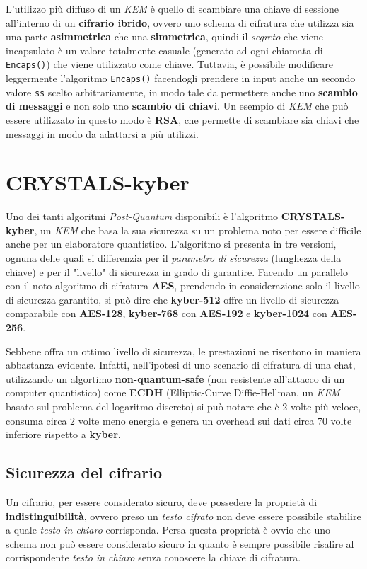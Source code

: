 L'utilizzo più diffuso di un \emph{KEM} è quello di scambiare una chiave di sessione all'interno di un \textbf{cifrario ibrido}, ovvero uno schema di cifratura che utilizza sia una parte \textbf{asimmetrica} che una \textbf{simmetrica}, quindi il \emph{segreto} che viene incapsulato è un valore totalmente casuale (generato ad ogni chiamata di \texttt{Encaps()}) che viene utilizzato come chiave. Tuttavia, è possibile modificare leggermente l'algoritmo \texttt{Encaps()} facendogli prendere in input anche un secondo valore \texttt{ss} scelto arbitrariamente, in modo tale da permettere anche uno \textbf{scambio di messaggi} e non solo uno \textbf{scambio di chiavi}. Un esempio di \emph{KEM} che può essere utilizzato in questo modo è \textbf{RSA}, che permette di scambiare sia chiavi che messaggi in modo da adattarsi a più utilizzi. \cite{wikipedia_kem}

\section{CRYSTALS-kyber}
Uno dei tanti algoritmi \emph{Post-Quantum} disponibili è l'algoritmo \textbf{CRYSTALS-kyber}, un \emph{KEM} che basa la sua sicurezza su un problema noto per essere difficile anche per un elaboratore quantistico. L'algoritmo si presenta in tre versioni, ognuna delle quali si differenzia per il \emph{parametro di sicurezza} (lunghezza della chiave) e per il "livello" di sicurezza in grado di garantire. Facendo un parallelo con il noto algoritmo di cifratura \textbf{AES}, prendendo in considerazione solo il livello di sicurezza garantito, si può dire che \textbf{kyber-512} offre un livello di sicurezza comparabile con \textbf{AES-128}, \textbf{kyber-768} con \textbf{AES-192} e \textbf{kyber-1024} con \textbf{AES-256}. \cite{kyber}

Sebbene offra un ottimo livello di sicurezza, le prestazioni ne risentono in maniera abbastanza evidente. Infatti, nell'ipotesi di uno scenario di cifratura di una chat, utilizzando un algortimo \textbf{non-quantum-safe} (non resistente all'attacco di un computer quantistico) come \textbf{ECDH} (Elliptic-Curve Diffie-Hellman, un \emph{KEM} basato sul problema del logaritmo discreto) si può notare che è 2 volte più veloce, consuma circa 2 volte meno energia e genera un overhead sui dati circa 70 volte inferiore rispetto a \textbf{kyber}. \cite{wikipedia_kyber}

\subsection{Sicurezza del cifrario}
Un cifrario, per essere considerato sicuro, deve possedere la proprietà di \textbf{indistinguibilità}, ovvero preso un \emph{testo cifrato} non deve essere possibile stabilire a quale \emph{testo in chiaro} corrisponda. Persa questa proprietà è ovvio che uno schema non può essere considerato sicuro in quanto è sempre possibile risalire al corrispondente \emph{testo in chiaro} senza conoscere la chiave di cifratura.

